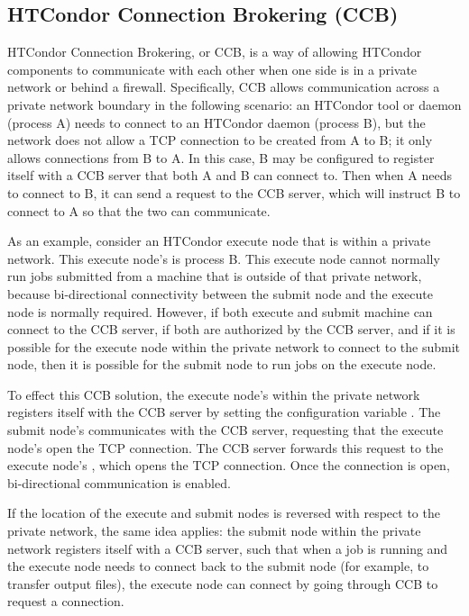 \subsection{\label{sec:CCB}HTCondor Connection Brokering (CCB)}

HTCondor Connection Brokering, or CCB, is a way of allowing HTCondor
components to communicate with each other when one side is in a
private network or behind a firewall.  Specifically, CCB allows
communication across a private network boundary in the following
scenario: an HTCondor tool or daemon (process A) needs to connect to an
HTCondor daemon (process B), but the network does not allow a TCP
connection to be created from A to B; it only allows connections from
B to A.  In this case, B may be configured
to register itself with a CCB server that both A and B can connect to.
Then when A needs to connect to B, it can send a request to the CCB
server, which will instruct B to connect to A so that the two can
communicate.

As an example, consider an HTCondor execute node that is within
a private network. 
This execute node's  is process B.
This execute node cannot normally run jobs submitted from a machine
that is outside of that private network, 
because bi-directional connectivity between the submit node and the
execute node is normally required.  
However, 
if both execute and submit machine can connect to the CCB server,
if both are authorized by the CCB server,
and if it is possible for the execute node within the private network
to connect to the submit node,
then it is possible for the submit node to run jobs on the
execute node.

To effect this CCB solution,
the execute node's  within the private network
registers itself with the CCB
server by setting the configuration variable .
The submit node's  communicates with the CCB server,
requesting that the execute node's  open the TCP
connection.
The CCB server forwards this request to the execute node's ,
which opens the TCP connection.
Once the connection is open, bi-directional communication is enabled.

If the location of the execute and submit nodes is reversed 
with respect to the private network,
the same idea applies:
the submit node within the private network registers itself with a CCB server,
such that when a job is running and the execute node needs to connect back to
the submit node (for example, to transfer output files), 
the execute node can connect by going through CCB to request a connection.

